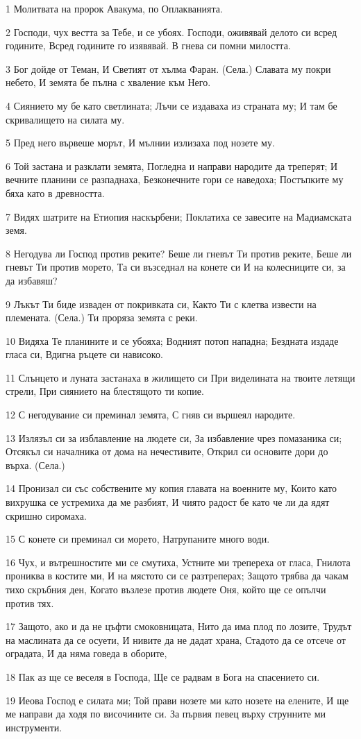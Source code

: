 \par 1 Молитвата на пророк Авакума, по Оплакванията.
\par 2 Господи, чух вестта за Тебе, и се убоях. Господи, оживявай делото си всред годините, Всред годините го изявявай. В гнева си помни милостта.
\par 3 Бог дойде от Теман, И Светият от хълма Фаран. (Села.) Славата му покри небето, И земята бе пълна с хваление към Него.
\par 4 Сиянието му бе като светлината; Лъчи се издаваха из страната му; И там бе скривалището на силата му.
\par 5 Пред него вървеше морът, И мълнии излизаха под нозете му.
\par 6 Той застана и разклати земята, Погледна и направи народите да треперят; И вечните планини се разпаднаха, Безконечните гори се наведоха; Постъпките му бяха като в древността.
\par 7 Видях шатрите на Етиопия наскърбени; Поклатиха се завесите на Мадиамската земя.
\par 8 Негодува ли Господ против реките? Беше ли гневът Ти против реките, Беше ли гневът Ти против морето, Та си възседнал на конете си И на колесниците си, за да избавяш?
\par 9 Лъкът Ти биде изваден от покривката си, Както Ти с клетва извести на племената. (Села.) Ти проряза земята с реки.
\par 10 Видяха Те планините и се убояха; Водният потоп нападна; Бездната издаде гласа си, Вдигна ръцете си нависоко.
\par 11 Слънцето и луната застанаха в жилището си При виделината на твоите летящи стрели, При сиянието на блестящото ти копие.
\par 12 С негодувание си преминал земята, С гняв си вършеял народите.
\par 13 Излязъл си за изблавление на людете си, За избавление чрез помазаника си; Отсякъл си началника от дома на нечестивите, Открил си основите дори до върха. (Села.)
\par 14 Пронизал си със собствените му копия главата на военните му, Които като вихрушка се устремиха да ме разбият, И чиято радост бе като че ли да ядят скришно сиромаха.
\par 15 С конете си преминал си морето, Натрупаните много води.
\par 16 Чух, и вътрешностите ми се смутиха, Устните ми трепереха от гласа, Гнилота прониква в костите ми, И на мястото си се разтреперах; Защото трябва да чакам тихо скръбния ден, Когато възлезе против людете Оня, който ще се опълчи против тях.
\par 17 Защото, ако и да не цъфти смоковницата, Нито да има плод по лозите, Трудът на маслината да се осуети, И нивите да не дадат храна, Стадото да се отсече от оградата, И да няма говеда в оборите,
\par 18 Пак аз ще се веселя в Господа, Ще се радвам в Бога на спасението си.
\par 19 Иеова Господ е силата ми; Той прави нозете ми като нозете на елените, И ще ме направи да ходя по височините си. За първия певец върху струнните ми инструменти.

